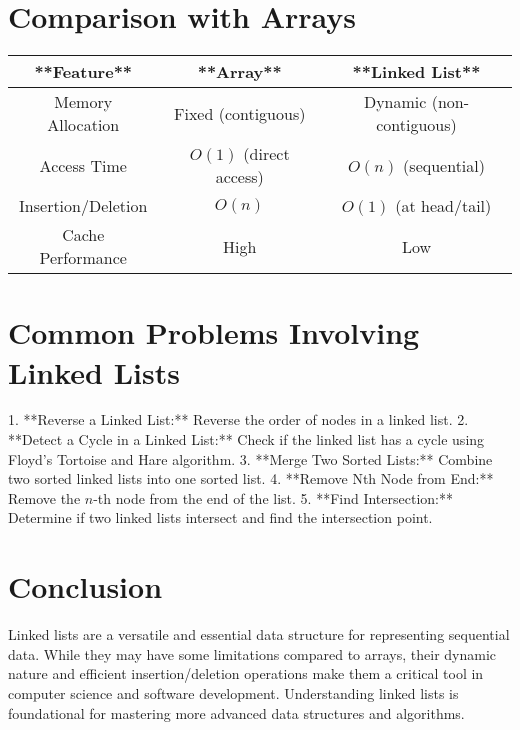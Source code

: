 \section*{Comparison with Arrays}
\begin{center}
\begin{tabular}{|c|c|c|}
\hline
**Feature**            & **Array**                 & **Linked List**         \\
\hline
Memory Allocation      & Fixed (contiguous)        & Dynamic (non-contiguous)\\
\hline
Access Time            & \(O(1)\) (direct access)  & \(O(n)\) (sequential)   \\
\hline
Insertion/Deletion     & \(O(n)\)                  & \(O(1)\) (at head/tail) \\
\hline
Cache Performance      & High                      & Low                     \\
\hline
\end{tabular}
\end{center}



\section*{Common Problems Involving Linked Lists}
1. **Reverse a Linked List:** Reverse the order of nodes in a linked list.
2. **Detect a Cycle in a Linked List:** Check if the linked list has a cycle using Floyd’s Tortoise and Hare algorithm.
3. **Merge Two Sorted Lists:** Combine two sorted linked lists into one sorted list.
4. **Remove Nth Node from End:** Remove the \(n\)-th node from the end of the list.
5. **Find Intersection:** Determine if two linked lists intersect and find the intersection point.



\section*{Conclusion}
Linked lists are a versatile and essential data structure for representing sequential data. While they may have some limitations compared to arrays, their dynamic nature and efficient insertion/deletion operations make them a critical tool in computer science and software development. Understanding linked lists is foundational for mastering more advanced data structures and algorithms.